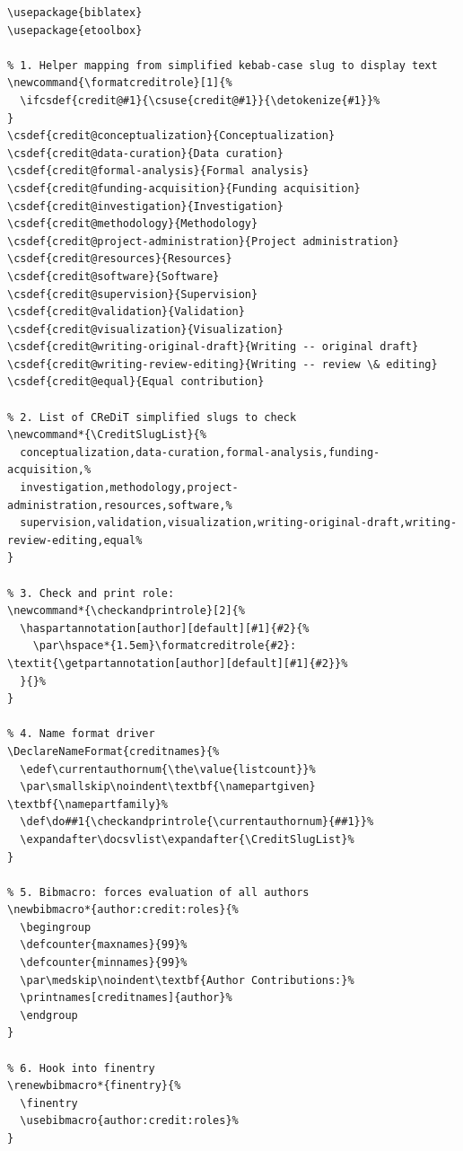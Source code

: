 \documentclass[12pt, twoside]{article}
\begin{document}
\begin{lstlisting}[style=latexExampleForAuthors, escapechar=|, basicstyle=\footnotesize, caption={{Iterate through slugs}}, label=lst:biberCreditRolesIterate]
\usepackage{biblatex}
\usepackage{etoolbox}

% 1. Helper mapping from simplified kebab-case slug to display text
\newcommand{\formatcreditrole}[1]{%
  \ifcsdef{credit@#1}{\csuse{credit@#1}}{\detokenize{#1}}%
}
\csdef{credit@conceptualization}{Conceptualization}
\csdef{credit@data-curation}{Data curation}
\csdef{credit@formal-analysis}{Formal analysis}
\csdef{credit@funding-acquisition}{Funding acquisition}
\csdef{credit@investigation}{Investigation}
\csdef{credit@methodology}{Methodology}
\csdef{credit@project-administration}{Project administration}
\csdef{credit@resources}{Resources}
\csdef{credit@software}{Software}
\csdef{credit@supervision}{Supervision}
\csdef{credit@validation}{Validation}
\csdef{credit@visualization}{Visualization}
\csdef{credit@writing-original-draft}{Writing -- original draft}
\csdef{credit@writing-review-editing}{Writing -- review \& editing}
\csdef{credit@equal}{Equal contribution}

% 2. List of CReDiT simplified slugs to check
\newcommand*{\CreditSlugList}{%
  conceptualization,data-curation,formal-analysis,funding-acquisition,%
  investigation,methodology,project-administration,resources,software,%
  supervision,validation,visualization,writing-original-draft,writing-review-editing,equal%
}

% 3. Check and print role:
\newcommand*{\checkandprintrole}[2]{%
  \haspartannotation[author][default][#1]{#2}{%
    \par\hspace*{1.5em}\formatcreditrole{#2}: \textit{\getpartannotation[author][default][#1]{#2}}%
  }{}%
}

% 4. Name format driver
\DeclareNameFormat{creditnames}{%
  \edef\currentauthornum{\the\value{listcount}}%
  \par\smallskip\noindent\textbf{\namepartgiven} \textbf{\namepartfamily}%
  \def\do##1{\checkandprintrole{\currentauthornum}{##1}}%
  \expandafter\docsvlist\expandafter{\CreditSlugList}%
}

% 5. Bibmacro: forces evaluation of all authors
\newbibmacro*{author:credit:roles}{%
  \begingroup
  \defcounter{maxnames}{99}%
  \defcounter{minnames}{99}%
  \par\medskip\noindent\textbf{Author Contributions:}%
  \printnames[creditnames]{author}%
  \endgroup
}

% 6. Hook into finentry
\renewbibmacro*{finentry}{%
  \finentry
  \usebibmacro{author:credit:roles}%
}
\end{lstlisting}
\end{document}
